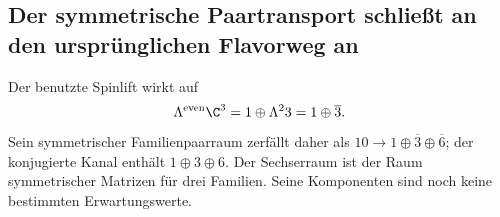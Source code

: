 
\subsection{Der symmetrische Paartransport schließt an den ursprünglichen Flavorweg an}
Der benutzte Spinlift wirkt auf
\begin{equation}
\Lambda^{\rm even}\C^3=1\oplus\Lambda^2 3=1\oplus\overline3.
\end{equation}
Sein symmetrischer Familienpaarraum zerfällt daher als $10\to1\oplus\overline3\oplus\overline6$; der konjugierte Kanal enthält $1\oplus3\oplus6$. Der Sechserraum ist der Raum symmetrischer Matrizen für drei Familien. Seine Komponenten sind noch keine bestimmten Erwartungswerte.

